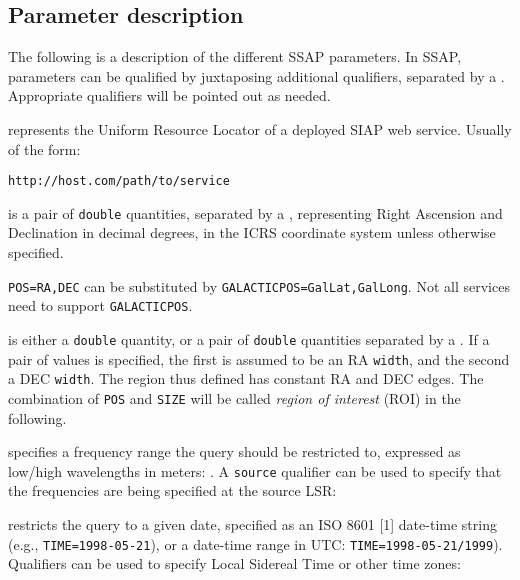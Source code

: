 	
	\subsection{Parameter description} %
	\label{sub:parameter_description_ssap}

	The following is a description of the different SSAP parameters.
	In SSAP, parameters can be qualified by juxtaposing
	additional qualifiers, separated by a \semicolon. Appropriate 
	qualifiers will be pointed out as needed.

	\begin{description}
		\item 
		
		\item[\texttt{endPointURL}] represents the Uniform Resource 
		Locator of a deployed SIAP web service. 
		Usually of the form:
		
		\texttt{http://host.com/path/to/service}

		\item[\texttt{RA,DEC}] is a pair of \texttt{double} 
		quantities, separated by a \comma, 
		representing Right Ascension and Declination 
		in decimal degrees, in the ICRS coordinate system unless 
		otherwise specified.
		
		\texttt{POS=RA,DEC} can be substituted by 
		\texttt{GALACTICPOS=GalLat,GalLong}. Not all services need 
		to support \texttt{GALACTICPOS}.
		
		\item[\texttt{searchRadius}] is either a \texttt{double} 
		quantity, or a pair of \texttt{double} quantities separated 
		by a \comma. If a pair of values is specified, 
		the first is assumed to be an RA \texttt{width}, and the 
		second a DEC \texttt{width}. The region thus defined has 
		constant RA and DEC edges. The combination of \texttt{POS} 
		and \texttt{SIZE} will be called \emph{region of interest}
		(ROI) in the following.
		
		\item[\texttt{freqRange}] specifies a frequency range the 
		query should be restricted to, expressed as low/high 
		wavelengths in meters: . A 
		\texttt{source} qualifier can be used to specify that
		the frequencies are being specified at the source LSR:

		\item[\texttt{timeRange}] restricts the query to a given 
		date, specified as an ISO 8601 [1] date-time string (e.g., 
		\texttt{TIME=1998-05-21}), or a date-time range in UTC: 
		\texttt{TIME=1998-05-21/1999}). Qualifiers can be used to 
		specify Local Sidereal Time or other time zones:
		

\end{description}
